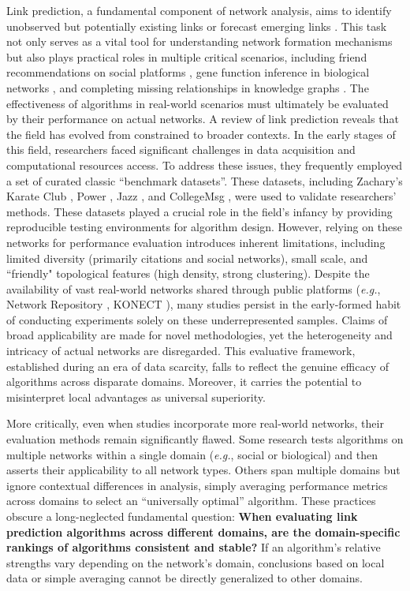 \documentclass{article}
\begin{document}
Link prediction, a fundamental component of network analysis, aims to identify unobserved but potentially existing links or forecast emerging links \cite{lv2011, wang2015, martinez2016, kumar2020, zhou2021, wu2022, arrar2024}. This task not only serves as a vital tool for understanding network formation mechanisms but also plays practical roles in multiple critical scenarios, including friend recommendations on social platforms \cite{leskovec2010}, gene function inference in biological networks \cite{musawi2025}, and completing missing relationships in knowledge graphs \cite{kazemi2018}. The effectiveness of algorithms in real-world scenarios must ultimately be evaluated by their performance on actual networks. A review of link prediction reveals that the field has evolved from constrained to broader contexts. In the early stages of this field, researchers faced significant challenges in data acquisition and computational resources access. To address these issues, they frequently employed a set of curated classic ``benchmark datasets''. These datasets, including Zachary's Karate Club \cite{zachary1977}, Power \cite{watts1998}, Jazz \cite{gleiser2003}, and CollegeMsg \cite{panzarasa2009}, were used to validate researchers' methods. These datasets played a crucial role in the field's infancy by providing reproducible testing environments for algorithm design. However, relying on these networks for performance evaluation introduces inherent limitations, including limited diversity (primarily citations and social networks), small scale, and ``friendly" topological features (high density, strong clustering). Despite the availability of vast real-world networks shared through public platforms (\textit{e.g.}, Network Repository \cite{rossi2015}, KONECT \cite{kunegis2013}), many studies persist in the early-formed habit of conducting experiments solely on these underrepresented samples. Claims of broad applicability are made for novel methodologies, yet the heterogeneity and intricacy of actual networks are disregarded. This evaluative framework, established during an era of data scarcity, falls to reflect the genuine efficacy of algorithms across disparate domains. Moreover, it carries the potential to misinterpret local advantages as universal superiority.
	
More critically, even when studies incorporate more real-world networks, their evaluation methods remain significantly flawed. Some research tests algorithms on multiple networks within a single domain (\textit{e.g.}, social or biological) and then asserts their applicability to all network types. Others span multiple domains but ignore contextual differences in analysis, simply averaging performance metrics across domains to select an ``universally optimal'' algorithm. These practices obscure a long-neglected fundamental question: \textbf{When evaluating link prediction algorithms across different domains, are the domain-specific rankings of algorithms consistent and stable?} If an algorithm's relative strengths vary depending on the network's domain, conclusions based on local data or simple averaging cannot be directly generalized to other domains.
	
\end{document}
